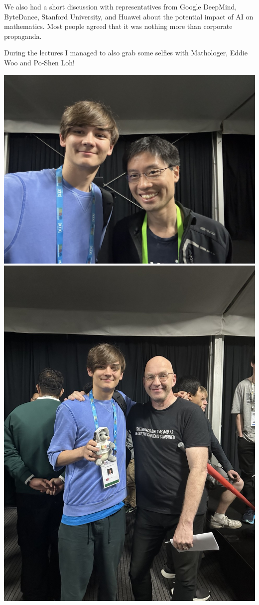 \documentclass{article}
\begin{document}
We also had a short discussion with representatives from Google DeepMind, ByteDance, Stanford University, and Huawei about the potential impact of AI on mathematics. Most people agreed that it was nothing more than corporate propaganda.

During the lectures I managed to also grab some selfies with Mathologer, Eddie Woo and Po-Shen Loh!

\begin{center}
  \includegraphics[scale=0.1]{assets/po.jpg}
  \includegraphics[scale=0.08]{assets/mathologer.jpg}

\end{center}
\end{document}
